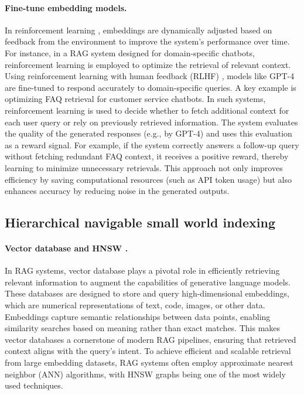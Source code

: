 \paragraph*{Fine-tune embedding models.} In reinforcement learning \cite{kulkarni2024rag}, embeddings are dynamically adjusted based on feedback from the environment to improve the system's performance over time. For instance, in a RAG system designed for domain-specific chatbots, reinforcement learning is employed to optimize the retrieval of relevant context. Using reinforcement learning with human feedback (RLHF) \cite{kulkarni2024rag}, models like GPT-4 are fine-tuned to respond accurately to domain-specific queries. A key example is optimizing FAQ retrieval for customer service chatbots. In such systems, reinforcement learning is used to decide whether to fetch additional context for each user query or rely on previously retrieved information. The system evaluates the quality of the generated responses (e.g., by GPT-4) and uses this evaluation as a reward signal. For example, if the system correctly answers a follow-up query without fetching redundant FAQ context, it receives a positive reward, thereby learning to minimize unnecessary retrievals. This approach not only improves efficiency by saving computational resources (such as API token usage) but also enhances accuracy by reducing noise in the generated outputs.

\subsection{Hierarchical navigable small world indexing}  

\paragraph*{Vector database and HNSW \cite{malkov2018hnsw}.} In RAG systems, vector database plays a pivotal role in efficiently retrieving relevant information to augment the capabilities of generative language models. These databases are designed to store and query high-dimensional embeddings, which are numerical representations of text, code, images, or other data. Embeddings capture semantic relationships between data points, enabling similarity searches based on meaning rather than exact matches. This makes vector databases a cornerstone of modern RAG pipelines, ensuring that retrieved context aligns with the query’s intent. To achieve efficient and scalable retrieval from large embedding datasets, RAG systems often employ approximate nearest neighbor (ANN) algorithms, with HNSW graphs \cite{malkov2018hnsw} being one of the most widely used techniques.
    
